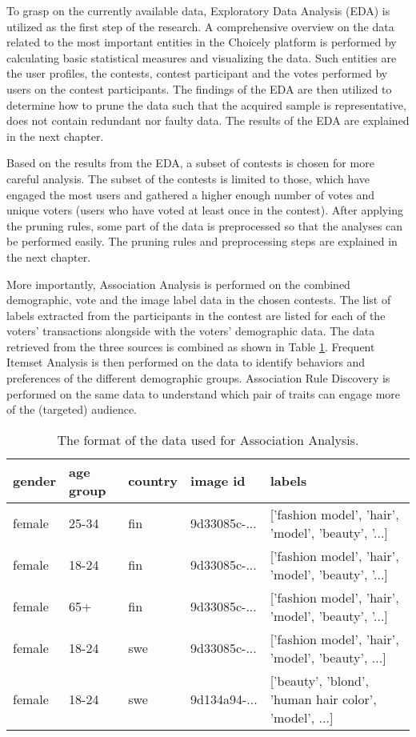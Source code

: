 To grasp on the currently available data, Exploratory Data Analysis (EDA) is utilized as the first step of the research. A comprehensive overview on the data related to the most important entities in the Choicely platform is performed by calculating basic statistical measures and visualizing the data. Such entities are the user profiles, the contests, contest participant and the votes performed by users on the contest participants. The findings of the EDA are then utilized to determine how to prune the data such that the acquired sample is representative, does not contain redundant nor faulty data. The results of the EDA are explained in the next chapter. 

Based on the results from the EDA, a subset of contests is chosen for more careful analysis. The subset of the contests is limited to those, which have engaged the most users and gathered a higher enough number of votes and unique voters (users who have voted at least once in the contest). After applying the pruning rules, some part of the data is preprocessed so that the analyses can be performed easily. The pruning rules and preprocessing steps are explained in the next chapter. 

More importantly, Association Analysis is performed on the combined demographic, vote and the image label data in the chosen contests. The list of labels extracted from the participants in the contest are listed for each of the voters' transactions alongside with the voters' demographic data. The data retrieved from the three sources is combined as shown in Table \ref{association_analyisis_data}. Frequent Itemset Analysis is then performed on the data to identify behaviors and preferences of the different demographic groups. Association Rule Discovery is performed on the same data to understand which pair of traits can engage more of the (targeted) audience.  

\begin{table}[]
    \centering
    \begin{tabular}{l|l|l|l|l}
        gender & age group & country & image id & labels \\
        \hline
        female & 25-34 & fin & 9d33085c-... & ['fashion model', 'hair', 'model', 'beauty', '...] \\
        female & 18-24 & fin & 9d33085c-... & ['fashion model', 'hair', 'model', 'beauty', '...] \\
        female & 65+ & fin & 9d33085c-... & ['fashion model', 'hair', 'model', 'beauty', '...] \\
        female & 18-24 & swe & 9d33085c-... & ['fashion model', 'hair', 'model', 'beauty', ...] \\
        female & 18-24 & swe & 9d134a94-... & ['beauty', 'blond', 'human hair color', 'model', ...]
    \end{tabular}
    \caption{The format of the data used for Association Analysis.}
    \label{association_analyisis_data}
\end{table}

